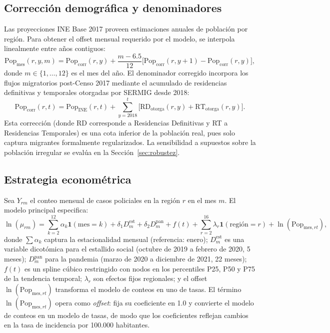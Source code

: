 \documentclass[12pt,a4paper]{article}
\begin{document}
\subsection{Correcci\'on demogr\'afica y denominadores}
\label{sub:pop}

Las proyecciones INE Base 2017 proveen estimaciones anuales de poblaci\'on por regi\'on.
Para obtener el offset mensual requerido por el modelo, se interpola linealmente entre
a\~nos contiguos:
\[
  \text{Pop}_{\text{mes}}(r,y,m)
  = \text{Pop}_{\text{corr}}(r,y)
  + \frac{m - 6.5}{12}
  \bigl[\text{Pop}_{\text{corr}}(r,y+1) - \text{Pop}_{\text{corr}}(r,y)\bigr],
\]
donde $m \in \{1,\ldots,12\}$ es el mes del a\~no. El denominador corregido incorpora
los flujos migratorios post-Censo 2017 mediante el acumulado de residencias definitivas
y temporales otorgadas por SERMIG desde 2018:
\[
  \text{Pop}_{\text{corr}}(r,t)
  = \text{Pop}_{\text{INE}}(r,t)
  + \sum_{y=2018}^{t}\bigl[\text{RD}_{\text{otorga}}(r,y) + \text{RT}_{\text{otorga}}(r,y)\bigr].
\]
Esta correcci\'on (donde RD corresponde a Residencias Definitivas y RT a Residencias Temporales)
es una cota inferior de la poblaci\'on real, pues solo captura
migrantes formalmente regularizados. La sensibilidad a supuestos sobre la poblaci\'on
irregular se eval\'ua en la Secci\'on~\ref{sec:robustez}.

\subsection{Estrategia econom\'etrica}

Sea $Y_{rm}$ el conteo mensual de casos policiales en la regi\'on $r$ en el mes $m$.
El modelo principal especifica:
\begin{equation}
  \ln(\mu_{rm})
  = \sum_{k=2}^{12} \alpha_k \mathbf{1}(\text{mes}=k)
  + \delta_1 D^{\text{est}}_m + \delta_2 D^{\text{pan}}_m
  + f(t) + \sum_{r=2}^{16} \lambda_r \mathbf{1}(\text{regi\'on}=r)
  + \ln(\text{Pop}_{\text{mes},rt}),
  \label{eq:poisson}
\end{equation}
donde $\sum \alpha_k$ captura la estacionalidad mensual (referencia: enero);
$D^{\text{est}}_m$ es una variable dicot\'omica para el estallido social (octubre de
2019 a febrero de 2020, 5 meses); $D^{\text{pan}}_m$ para la pandemia (marzo de 2020
a diciembre de 2021, 22 meses); $f(t)$ es un spline c\'ubico restringido con nodos
en los percentiles P25, P50 y P75 de la tendencia temporal; $\lambda_r$ son efectos
fijos regionales; y el offset $\ln(\text{Pop}_{\text{mes},rt})$ transforma el modelo
de conteos en uno de tasas. El t\'ermino $\ln(\text{Pop}_{\text{mes},rt})$ opera como \textit{offset}: fija su coeficiente en 1.0 y convierte el modelo de conteos en un modelo de tasas, de modo que los coeficientes reflejan cambios en la tasa de incidencia por 100.000 habitantes.
\end{document}
